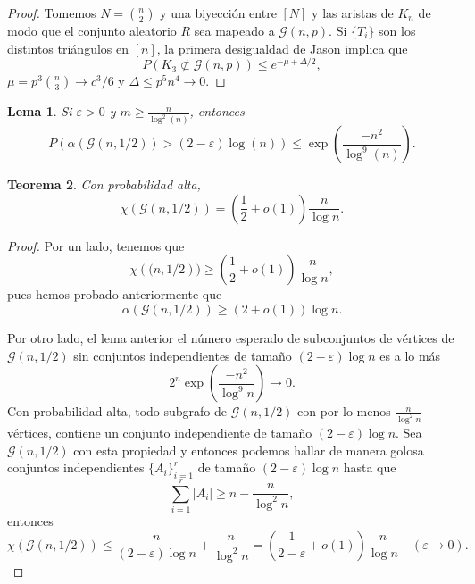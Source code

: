 \documentclass[12pt]{report}
\theoremstyle{plain}
\newtheorem{theorem}{Teorema}[section]
\newtheorem{lemma}[theorem]{Lema}
\theoremstyle{definition}
\newcommand{\abs}[1]{\left \vert #1 \right \vert}
\begin{document}
\begin{proof}
    Tomemos $N = \binom n 2$ y una biyección entre $[N]$ y las aristas de $K_n$ de modo que el conjunto aleatorio $R$ sea mapeado a $\mathcal G (n, p)$. Si $\{T_i\}$ son los distintos triángulos en $[n]$, la primera desigualdad de Jason implica que
    \[
        P (K_3 \not \subset \mathcal G (n, p)) \leq e^{- \mu + \Delta / 2},
    \]
    $\mu = p^3 \binom n 3 \to c^3 / 6$ y $\Delta \leq p^5 n^4 \to 0$.
\end{proof}


\begin{lemma}
Si $\varepsilon > 0$ y $m \geq \frac{n}{\log ^2 (n)}$, entonces
\[
    P (\alpha (\mathcal G (n, 1/2)) > (2 - \varepsilon) \log (n)) \leq \exp ( \frac{-n^2}{\log^9 (n)}).
\]
\end{lemma}

\begin{theorem}
Con probabilidad alta,
\[
    \chi (\mathcal G (n, 1/2)) = (\frac 1 2 + o(1)) \frac{n}{\log n}.
\]
\end{theorem}

\begin{proof}
Por un lado, tenemos que
\[
\chi (\mathcal (n, 1/2)) \geq (\frac 1 2 + o(1))
\frac{n}{\log n},
\]
pues hemos probado anteriormente que
\[
\alpha (\mathcal G (n, 1/2)) \geq (2 + o(1)) \log n.
\]

Por otro lado, el lema anterior el número esperado de subconjuntos de vértices de $\mathcal G (n, 1/2)$ sin conjuntos independientes de tamaño $(2- \varepsilon) \log n$ es a lo más
\[
2^n \exp (\frac{- n^2}{\log^9 n}) \longrightarrow 0.
\]
Con probabilidad alta, todo subgrafo de $\mathcal G (n, 1/2)$ con por lo menos $\frac{n}{\log^2 n}$ vértices, contiene un conjunto independiente de tamaño $(2-\varepsilon) \log n$. Sea $\mathcal G (n, 1/2)$ con esta propiedad y entonces podemos hallar de manera golosa conjuntos independientes $\{A_i\}_{i = 1}^r$ de tamaño $(2-\varepsilon) \log n$ hasta que
\[
    \sum_{i = 1}^r \abs{A_i} \geq n - \frac{n}{\log^2 n},
\]
entonces
\[
    \chi (\mathcal G (n, 1/2)) \leq \frac{n}{(2-\varepsilon) \log n} + \frac{n}{\log ^2 n} = (\frac{1}{2 - \varepsilon} + o(1)) \frac{n}{\log n} \quad ( \varepsilon \to 0).
\]
\end{proof}
\end{document}
